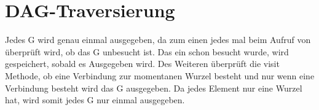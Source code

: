 \section{DAG-Traversierung}
Jedes G wird genau einmal ausgegeben, da zum einen jedes mal beim Aufruf von überprüft wird, ob das G unbesucht ist. Das ein schon besucht wurde, wird gespeichert, sobald es Ausgegeben wird. Des Weiteren überprüft die visit Methode, ob eine Verbindung zur momentanen Wurzel besteht und nur wenn eine Verbindung besteht wird das G ausgegeben. Da jedes Element nur eine Wurzel hat, wird somit jedes G nur einmal ausgegeben.